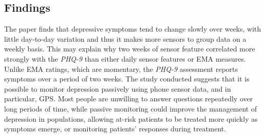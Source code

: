 \subsection{Findings}
The paper finds that depressive symptoms tend to change slowly over weeks, with little day-to-day variation and thus it makes more sensors to group data on a weekly basis. This may explain why two weeks of sensor feature correlated more strongly with the \textit{PHQ-9} than either daily sensor features or EMA measures. Unlike EMA ratings, which are momentary, the \textit{PHQ-9} assessment reports symptoms over a period of two weeks. The study conducted suggests that it is possible to monitor depression passively using phone sensor data, and in particular, GPS. Most people are unwilling to answer questions repeatedly over long periods of time, while passive monitoring could improve the management of depression in populations, allowing at-risk patients to be treated more quickly as symptoms emerge, or monitoring patients’ responses during treatment.